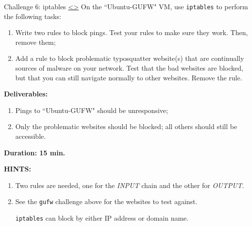 \documentclass[12pt]{extarticle}
\newenvironment{instructionblock}{\Large\bgroup}{\egroup}
\newcommand{\ben}{\begin{enumerate}}
\newcommand{\een}{\end{enumerate}}
\begin{document}
\pagebreak
\begin{slide}{ Challenge 6: iptables }{ \hyperref[slide 23]{\textless}\hyperref[slide 25]{\textgreater} }
\vskip 5pt
\begin{instructionblock}
	On the ``Ubuntu-GUFW" VM, use \texttt{iptables} to perform the following tasks:
	\begin{enumerate}
	\item{ Write two rules to block pings. Test your rules to make sure they work. Then, remove them; }
	\item{ Add a rule to block problematic typosquatter website(s) that are continually sources of malware on your network. Test that the bad websites are blocked, but that you can still navigate normally to other websites. Remove the rule. }
	\end{enumerate}

\end{instructionblock}

\textbf{\Large{Deliverables:}}
\ben
\item Pings to ``Ubuntu-GUFW" should be unresponsive; 
\item Only the problematic websites should be blocked; all others should still be accessible. 
\een

\vspace{20mm}
\begin{center}
	\textbf{\Large{Duration: 15 min.} }
\end{center}

\end{slide}


\vspace{8mm}
\noindent
\textbf{HINTS:}
\begin{enumerate}

\item Two rules are needed, one for the \textit{INPUT} chain and the other for \textit{OUTPUT}.   

\item See the \texttt{gufw} challenge above for the websites to test against.

\texttt{iptables} can block by either IP address or domain name.

\end{enumerate}


\end{document}
